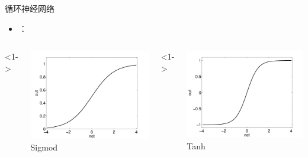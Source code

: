 \begin{xframe}{循环神经网络}

    \begin{itemize}
        \item {：\\
        }
    \end{itemize}


    \begin{columns}
        <1->
        \begin{center}
            \includegraphics[width=\textwidth,height=0.5\textheight]{./style/images/logistic.pdf}
            Sigmod
        \end{center}

        <1->
        \begin{center}
            \includegraphics[width=\textwidth,height=0.5\textheight]{./style/images/tanh.pdf}
            Tanh
        \end{center}

    \end{columns}

\end{xframe}

